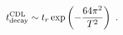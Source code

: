 \begin{equation}\label{thin4}
t^{\rm CDL}_{\rm decay}\sim t_r    \exp\left(-{64\pi^2\over T^2}\right)
\ .
\end{equation}

